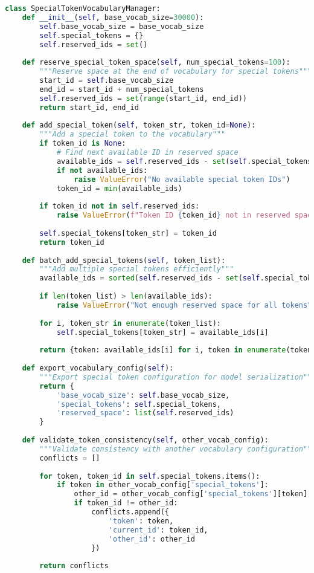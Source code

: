 \begin{lstlisting}[language=Python, caption=Special token vocabulary management]
class SpecialTokenVocabularyManager:
    def __init__(self, base_vocab_size=30000):
        self.base_vocab_size = base_vocab_size
        self.special_tokens = {}
        self.reserved_ids = set()
        
    def reserve_special_token_space(self, num_special_tokens=100):
        """Reserve space at the end of vocabulary for special tokens"""
        start_id = self.base_vocab_size
        end_id = start_id + num_special_tokens
        self.reserved_ids = set(range(start_id, end_id))
        return start_id, end_id
    
    def add_special_token(self, token_str, token_id=None):
        """Add a special token to the vocabulary"""
        if token_id is None:
            # Find next available ID in reserved space
            available_ids = self.reserved_ids - set(self.special_tokens.values())
            if not available_ids:
                raise ValueError("No available special token IDs")
            token_id = min(available_ids)
        
        if token_id not in self.reserved_ids:
            raise ValueError(f"Token ID {token_id} not in reserved space")
        
        self.special_tokens[token_str] = token_id
        return token_id
    
    def batch_add_special_tokens(self, token_list):
        """Add multiple special tokens efficiently"""
        available_ids = sorted(self.reserved_ids - set(self.special_tokens.values()))
        
        if len(token_list) > len(available_ids):
            raise ValueError("Not enough reserved space for all tokens")
        
        for i, token_str in enumerate(token_list):
            self.special_tokens[token_str] = available_ids[i]
        
        return {token: available_ids[i] for i, token in enumerate(token_list)}
    
    def export_vocabulary_config(self):
        """Export special token configuration for model serialization"""
        return {
            'base_vocab_size': self.base_vocab_size,
            'special_tokens': self.special_tokens,
            'reserved_space': list(self.reserved_ids)
        }
    
    def validate_token_consistency(self, other_vocab_config):
        """Validate consistency with another vocabulary configuration"""
        conflicts = []
        
        for token, token_id in self.special_tokens.items():
            if token in other_vocab_config['special_tokens']:
                other_id = other_vocab_config['special_tokens'][token]
                if token_id != other_id:
                    conflicts.append({
                        'token': token,
                        'current_id': token_id,
                        'other_id': other_id
                    })
        
        return conflicts
\end{lstlisting}

